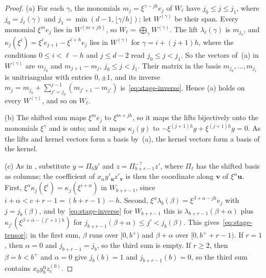 \begin{proof}
(a) For each \(\gamma\), the monomials \(m_j=\xi^{\gamma-jh}e_j\) of
\(W_\ell\) have \(j_0\le j\le j_1\), where \(j_0=j_\ell(\gamma)\) and
\(j_1=\min(d-1,\lfloor\gamma/h\rfloor)\); let \(W^{(\gamma)}\) be their
span. Every monomial \(\xi^me_j\) lies in \(W^{(m+jh)}\), so
\(W_\ell=\bigoplus_\gamma W^{(\gamma)}\). The lift \(\lambda_\ell(\gamma)\)
is \(m_{j_0}\), and \(\kappa_j(\xi^i)=\xi^ie_{j+1}-\xi^{i+h}e_j\) lies in
\(W^{(\gamma)}\) for \(\gamma=i+(j+1)h\), where the conditions
\(0\le i<\ell-h\) and \(j\le d-2\) read \(j_0\le j<j_1\). So the vectors
of~(a) in \(W^{(\gamma)}\) are \(m_{j_0}\) and \(m_{j+1}-m_j\),
\(j_0\le j<j_1\). Their matrix in the basis \(m_{j_0},\ldots,m_{j_1}\) is
unitriangular with entries \(0,\pm1\), and its inverse
\(m_j=m_{j_0}+\sum_{j'=j_0}^{j-1}(m_{j'+1}-m_{j'})\)
is~\eqref{eq:stage-inverse}. Hence (a) holds on every \(W^{(\gamma)}\),
and so on \(W_\ell\).

(b) The shifted sum maps \(\xi^me_j\) to \(\xi^{m+jh}\), so it maps the
lifts bijectively onto the monomials \(\xi^\gamma\) and is onto; and it
maps \(\kappa_j(g)\) to \(-\xi^{(j+1)h}g+\xi^{(j+1)h}g=0\). As the lifts
and kernel vectors form a basis by~(a), the kernel vectors form a basis of
the kernel.

(c) As in \citep[Section~4.1]{FinCon26}, substitute \(y=\Pi_by'\) and
\(z=\Pi_{b+r-1}^{-\top}z'\), where \(\Pi_\ell\) has the shifted basis as
columns; the coefficient of \(x_\alpha y'_{\mathbf u}z'_{\mathbf v}\) is
then the coordinate along \(\mathbf v\) of \(\xi^\alpha\mathbf u\). First,
\(\xi^\alpha\kappa_j(\xi^i)=\kappa_j(\xi^{i+\alpha})\) in \(W_{b+r-1}\),
since \(i+\alpha<c+r-1=(b+r-1)-h\). Second,
\(\xi^\alpha\lambda_b(\beta)=\xi^{\beta+\alpha-jh}e_j\) with
\(j=j_b(\beta)\), and by~\eqref{eq:stage-inverse} for \(W_{b+r-1}\) this
is \(\lambda_{b+r-1}(\beta+\alpha)\) plus
\(\kappa_{j'}(\xi^{\beta+\alpha-(j'+1)h})\) for
\(j_{b+r-1}(\beta+\alpha)\le j'<j_b(\beta)\). This
gives~\eqref{eq:stage-tensor}; in the first sum, \(\beta\) runs over
\([0,b^+)\) and \(\beta+\alpha\) over \([0,b^++r-1)\). If \(r=1\), then
\(\alpha=0\) and \(j_{b+r-1}=j_b\), so the third sum is empty. If
\(r\ge2\), then \(\beta=b<b^+\) and \(\alpha=0\) give \(j_b(b)=1\) and
\(j_{b+r-1}(b)=0\), so the third sum contains
\(x_0y^{\mathrm q}_bz^{(0)}_c\).
\end{proof}

